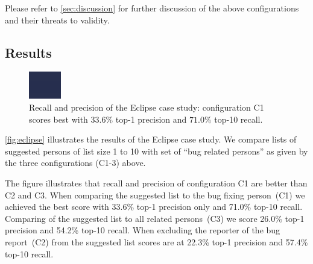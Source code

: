 \documentclass[10pt]{book}
\begin{document}
Please refer to \autoref{sec:discussion} for further discussion of the above configurations and their threats to validity.

\subsection{Results}\label{therealthing}

\begin{figure}
    \includegraphics[width=\linewidth]{runOnTestSet}
    \caption{Recall and precision of the Eclipse case study: configuration C1 scores best with $33.6\%$ top-1 precision and $71.0\%$ top-10 recall.}
    \label{fig:eclipse}
\end{figure} 

\autoref{fig:eclipse} illustrates the results of the Eclipse case study. We compare lists of suggested persons of list size 1 to 10 with set of ``bug related persons'' as given by the three configurations (C1-3) above.

The figure illustrates that recall and precision of configuration C1 are better than C2 and C3. When comparing the suggested list to the bug fixing person~(C1) we achieved the best score with 33.6\% top-1 precision only and 71.0\% top-10 recall. Comparing of the suggested list to all related persons~(C3) we score 26.0\% top-1 precision and 54.2\% top-10 recall. When excluding the reporter of the bug report~(C2) from the suggested list scores are at 22.3\% top-1 precision and 57.4\% top-10 recall.
\end{document}
